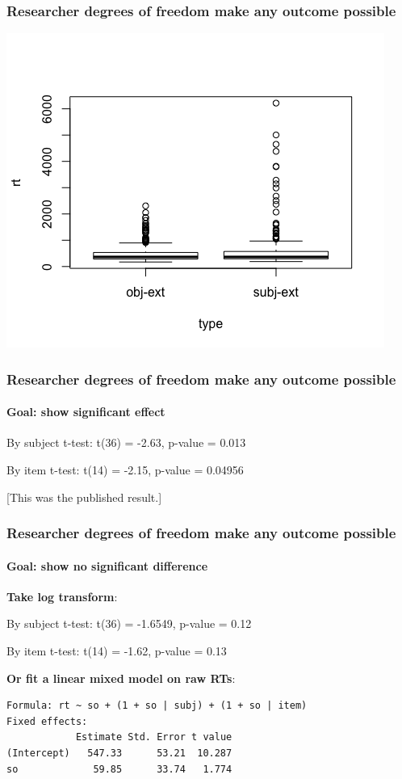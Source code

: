 \documentclass{beamer}
\begin{document}
\begin{frame}
\frametitle{Researcher degrees of freedom make any outcome possible}

\begin{center}
\includegraphics[scale=0.5]{gibsonwudistrn.png}
\end{center}



\end{frame}

\begin{frame}
\frametitle{Researcher degrees of freedom make any outcome possible}
\framesubtitle{Goal: show significant effect}

By subject t-test: t(36) = -2.63, p-value = 0.013 

By item t-test: t(14) = -2.15, p-value = 0.04956


[This was the published result.]
\end{frame}

\begin{frame}[fragile]\frametitle{Researcher degrees of freedom make any outcome possible}
\framesubtitle{Goal: show no significant difference}

\textbf{Take log transform}:

By subject t-test: t(36) = -1.6549, p-value = 0.12

By item t-test: t(14) = -1.62, p-value = 0.13 

\medskip

\textbf{Or fit a linear mixed model on raw RTs}:

\begin{verbatim}
Formula: rt ~ so + (1 + so | subj) + (1 + so | item)
Fixed effects:
            Estimate Std. Error t value
(Intercept)   547.33      53.21  10.287
so             59.85      33.74   1.774
\end{verbatim}
\end{frame}
\end{document}

